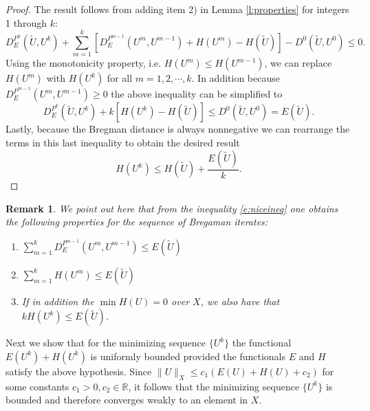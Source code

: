 \documentclass[11pt]{article}
\newcommand{\R}{\mathbb{R}}
\theoremstyle{plain}
\newtheorem{Remark}[Lemma]{Remark}
\begin{document}
\begin{proof}
The result follows from adding item 2) in Lemma \ref{l:properties} for integers 1 through $k$: 
\begin{equation}\label{e:niceineq}
 D^{P^k}_E(\tilde{U},U^k) + \sum_{m=1}^k \left[ D^{P^{m-1}}_E(U^m,U^{m-1}) + H(U^m) - H(\tilde{U}) \right] - D^0(\tilde{U},U^0) \leq 0.
 \end{equation}
Using the monotonicity property, i.e. $H(U^m)\leq H(U^{m-1})$, we can replace $H(U^m)$ with $H(U^k)$ for all $m=1,2,\cdots, k$. In addition because $D^{P^{m-1}}_E(U^m, U^{m-1}) \geq 0$ the above inequality can be simplified to
\[ D^{P^k}_E(\tilde{U},U^k) +  k \left [H(U^k) - H(\tilde{U}) \right] \leq  D^0(\tilde{U},U^0) =E(\tilde{U}). \]
Lastly, because the Bregman distance is always nonnegative we can rearrange the terms in this last inequality to obtain the desired result $$H(U^k) \leq H(\tilde{U}) + \frac{E(\tilde{U})}{k}.$$

\end{proof}

\begin{Remark}\label{r:properties}
We point out here that from the inequality \eqref{e:niceineq} one obtains the following properties for the sequence of Bregaman iterates:
\begin{enumerate}
\item $ \sum_{m=1}^k D^{P^{m-1}}_E(U^m,U^{m-1}) \leq E(\tilde{U} )$
\item $ \sum_{m=1}^k H(U^m) \leq E(\tilde{U}) $
\item If in addition the $\min H(U) =0$ over $X$, we also have that $kH(U^k) \leq E(\tilde{U})$.
\end{enumerate}
\end{Remark}




Next we show that for the minimizing sequence $\{U^k\}$ the functional $E(U^k) + H(U^k)$ is uniformly bounded provided the functionals $E$ and $H$ satisfy the above hypothesis. Since $\|U\|_X \leq c_1( E(U)+H(U) +c_2)$ for some constants $c_1>0, c_2 \in \R$, it follows that the minimizing sequence $\{U^k\}$ is bounded and therefore converges weakly to an element in $X$.
\end{document}
